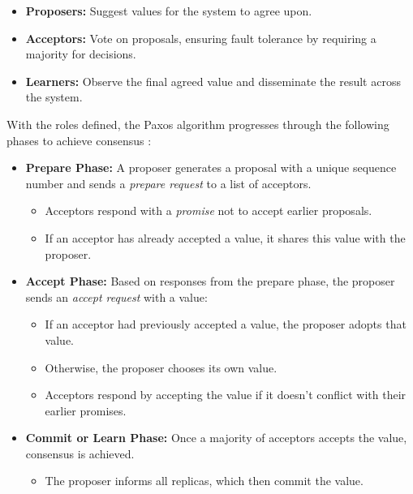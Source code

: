 \begin{itemize}
    \item \textbf{Proposers:} Suggest values for the system to agree upon.
    \item \textbf{Acceptors:} Vote on proposals, ensuring fault tolerance by requiring a majority for decisions.
    \item \textbf{Learners:} Observe the final agreed value and disseminate the result across the system.
\end{itemize}

With the roles defined, the Paxos algorithm progresses through the following phases to achieve consensus \cite{Tanenbaum2023, Coulouris2012, Howard2020}:

\begin{itemize}
    \item \textbf{Prepare Phase:}
          A proposer generates a proposal with a unique sequence number and sends a \textit{prepare request} to a list of acceptors.
          \begin{itemize}
              \item Acceptors respond with a \textit{promise} not to accept earlier proposals.
              \item If an acceptor has already accepted a value, it shares this value with the proposer.
          \end{itemize}

    \item \textbf{Accept Phase:}
          Based on responses from the prepare phase, the proposer sends an \textit{accept request} with a value:
          \begin{itemize}
              \item If an acceptor had previously accepted a value, the proposer adopts that value.
              \item Otherwise, the proposer chooses its own value.
              \item Acceptors respond by accepting the value if it doesn’t conflict with their earlier promises.
          \end{itemize}

    \item \textbf{Commit or Learn Phase:}
          Once a majority of acceptors accepts the value, consensus is achieved.
          \begin{itemize}
              \item The proposer informs all replicas, which then commit the value.
          \end{itemize}
\end{itemize}

